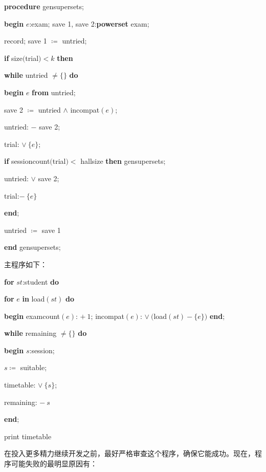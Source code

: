 \documentclass[twoside,11pt,fontset=none]{ctexbook}
\begin{document}
\quad \textbf{procedure} gensupersets;

\quad \quad \textbf{begin} $e$:exam; save 1, save 2:\textbf{powerset} exam;

\quad \quad \quad record; save 1 $\coloneq$ untried;

\quad \quad \quad \textbf{if} size$($trial$) < k$ \textbf{then}

\quad \quad \quad \quad \textbf{while} untried $\neq \{\}$ \textbf{do}

\quad \quad \quad \quad \quad \textbf{begin} $e$ \textbf{from} untried;

\quad \quad \quad \quad \quad \quad save 2 $\coloneq$ untried $\wedge$ incompat$(e)$;

\quad \quad \quad \quad \quad \quad untried: $-$ save 2;

\quad \quad \quad \quad \quad \quad trial: $\vee\ \{e\}$;

\quad \quad \quad \quad \quad \quad \textbf{if} sessioncount$($trial$) <$ hallsize \textbf{then} gensupersets;

\quad \quad \quad \quad \quad \quad untried: $\vee$ save 2;

\quad \quad \quad \quad \quad \quad trial:$-\ \{e\}$

\quad \quad \quad \quad \quad \textbf{end};

\quad \quad \quad \quad untried $\coloneq$ save 1

\quad \textbf{end} gensupersets;

\noindent
主程序如下：

\quad \textbf{for} $st$:student \textbf{do}

\quad \quad \textbf{for} $e$ \textbf{in} load$(st)$ \textbf{do}

\quad \quad \quad \textbf{begin} examcount$(e)$: $+\ 1$; incompat$(e)$: $\vee\ ($load$(st) - \{e\})$ \textbf{end};

\quad \textbf{while} remaining $\neq \{\}$ \textbf{do}

\quad \quad \quad \textbf{begin} $s$:session;

\quad \quad \quad \quad $s\coloneq$ suitable;

\quad \quad \quad \quad timetable: $\vee\ \{s\}$;

\quad \quad \quad \quad remaining: $-\ s$

\quad \quad \quad \textbf{end};

\quad print timetable

在投入更多精力继续开发之前，最好严格审查这个程序，确保它能成功。现在，程序可能失败的最明显原因有：
\end{document}
